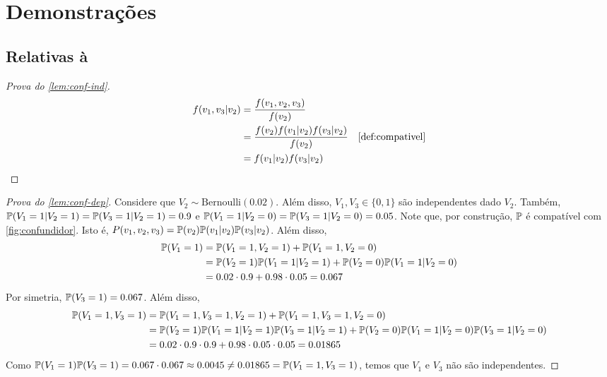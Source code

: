 


\appendix
\chapter{Demonstrações}

\section{Relativas à }

\begin{proof}[Prova do \cref{lem:conf-ind}]
 \begin{align*}
  f(v_1,v_3|v_2) 
  &= \frac{f(v_1,v_2,v_3)}{f(v_2)} \\
  &= \frac{f(v_2)f(v_1|v_2)f(v_3|v_2)}{f(v_2)} 
  & \text{\cref{def:compativel}} \\
  &= f(v_1|v_2)f(v_3|v_2)
 \end{align*}
\end{proof}

\begin{proof}[Prova do \cref{lem:conf-dep}]
 Considere que $V_2 \sim \text{Bernoulli}(0.02)$.
 Além disso, $V_1, V_3 \in \{0,1\}$ são independentes dado $V_2$. 
 Também,
 $\P(V_1 = 1|V_2 = 1) = \P(V_3 = 1|V_2 = 1) = 0.9$ e
 $\P(V_1 = 1|V_2 = 0) = \P(V_3 = 1|V_2 = 0) = 0.05$.
 Note que, por construção, $\P$ é 
 compatível com \cref{fig:confundidor}.
 Isto é, $P(v_1,v_2,v_3) = \P(v_2)\P(v_1|v_2)\P(v_3|v_2)$.
 Além disso,
 \begin{align*}
  \P(V_1 = 1) &= \P(V_1 = 1, V_2 = 1) + \P(V_1 = 1, V_2 = 0) \\
              &= \P(V_2=1)\P(V_1=1|V_2=1)
               +\P(V_2=0)\P(V_1=1|V_2=0) \\
              &= 0.02 \cdot 0.9 + 0.98 \cdot 0.05= 0.067
 \end{align*}
 Por simetria, $\P(V_3=1) = 0.067$. Além disso,
 \begin{align*}
  \P(V_1 = 1, V_3 = 1)
  &= \P(V_1 = 1, V_3 = 1, V_2 = 1) 
  +  \P(V_1 = 1, V_3 = 1, V_2 = 0) \\
  &= \P(V_2 = 1)\P(V_1 = 1|V_2 = 1)\P(V_3 = 1|V_2 = 1)
  +  \P(V_2 = 0)\P(V_1 = 1|V_2 = 0)\P(V_3 = 1|V_2 = 0) \\
  &= 0.02 \cdot 0.9 \cdot 0.9 + 0.98 \cdot 0.05 \cdot 0.05 = 0.01865
 \end{align*}
 Como $\P(V_1=1)\P(V_3=1) = 0.067 \cdot 0.067 \approx 0.0045 \neq 0.01865 = \P(V_1=1,V_3=1)$,
 temos que $V_1$ e $V_3$ não são independentes.
\end{proof}

